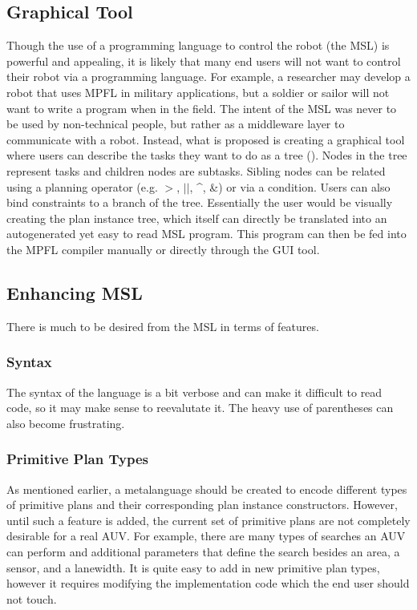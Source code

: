 \subsection{Graphical Tool}
Though the use of a programming language to control the robot (the MSL) is powerful and appealing, it is likely that many end users will not want to control their robot via a programming language. For example, a researcher may develop a robot that uses MPFL  in military applications, but a soldier or sailor will not want to write a program when in the field. The intent of the MSL was never to be used by non-technical people, but rather as a middleware layer to communicate with a robot. Instead, what is proposed is creating a graphical tool where users can describe the tasks they want to do as a tree (). Nodes in the tree represent tasks and children nodes are subtasks. Sibling nodes can be related using a planning operator (e.g. $>$, $||$, \^{}, \&) or via a condition. Users can also bind constraints to a branch of the tree. Essentially the user would be visually creating the plan instance tree, which itself can directly be translated into an autogenerated yet easy to read MSL program. This program can then be fed into the MPFL compiler manually or directly through the GUI tool.


\subsection{Enhancing MSL}
There is much to be desired from the MSL in terms of features. 

\subsubsection{Syntax}
The syntax of the language is a bit verbose and can make it difficult to read code, so it may make sense to reevalutate it. The heavy use of parentheses can also become frustrating. 

\subsubsection{Primitive Plan Types}
As mentioned earlier, a metalanguage should be created to encode different types of primitive plans and their corresponding plan instance constructors. However, until such a feature is added, the current set of primitive plans are not completely desirable for a real AUV. For example, there are many types of searches an AUV can perform and additional parameters that define the search besides an area, a sensor, and a lanewidth. It is quite easy to add in new primitive plan types, however it requires modifying the implementation code which the end user should not touch.

